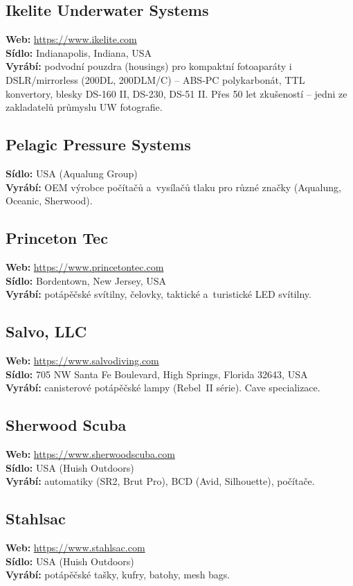 \documentclass[11pt,a4paper]{article}
\begin{document}
\subsection{Ikelite Underwater Systems}
\textbf{Web:} \url{https://www.ikelite.com} \\
\textbf{Sídlo:} Indianapolis, Indiana, USA \\
\textbf{Vyrábí:} podvodní pouzdra (housings) pro kompaktní fotoaparáty i DSLR/mirrorless (200DL, 200DLM/C) -- ABS-PC polykarbonát, TTL konvertory, blesky DS-160 II, DS-230, DS-51 II. Přes 50 let zkušeností -- jedni ze zakladatelů průmyslu UW fotografie.

\subsection{Pelagic Pressure Systems}
\textbf{Sídlo:} USA (Aqualung Group) \\
\textbf{Vyrábí:} OEM výrobce počítačů a~vysílačů tlaku pro různé značky (Aqualung, Oceanic, Sherwood).

\subsection{Princeton Tec}
\textbf{Web:} \url{https://www.princetontec.com} \\
\textbf{Sídlo:} Bordentown, New Jersey, USA \\
\textbf{Vyrábí:} potápěčské svítilny, čelovky, taktické a~turistické LED svítilny.

\subsection{Salvo, LLC}
\textbf{Web:} \url{https://www.salvodiving.com} \\
\textbf{Sídlo:} 705 NW Santa Fe Boulevard, High Springs, Florida 32643, USA \\
\textbf{Vyrábí:} canisterové potápěčské lampy (Rebel~II série). Cave specializace.

\subsection{Sherwood Scuba}
\textbf{Web:} \url{https://www.sherwoodscuba.com} \\
\textbf{Sídlo:} USA (Huish Outdoors) \\
\textbf{Vyrábí:} automatiky (SR2, Brut Pro), BCD (Avid, Silhouette), počítače.

\subsection{Stahlsac}
\textbf{Web:} \url{https://www.stahlsac.com} \\
\textbf{Sídlo:} USA (Huish Outdoors) \\
\textbf{Vyrábí:} potápěčské tašky, kufry, batohy, mesh bags.
\end{document}
